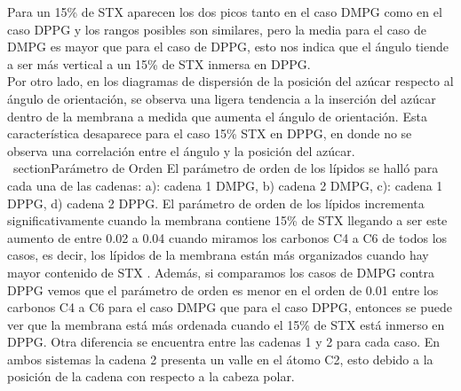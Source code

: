 
Para un 15\% de STX aparecen los dos picos tanto en el caso DMPG como en el caso DPPG y los rangos posibles son similares, pero la media para el caso de DMPG es mayor que para el caso de DPPG, esto nos indica que el \'{a}ngulo tiende a ser m\'{a}s vertical a un 15\% de STX inmersa en DPPG.\\ 

Por otro lado, en los diagramas de dispersi\'{o}n de la posici\'{o}n del az\'{u}car respecto al \'{a}ngulo de orientaci\'{o}n, se observa una ligera tendencia a la inserci\'{o}n del az\'{u}car dentro de la membrana a medida que aumenta el \'{a}ngulo de orientaci\'{o}n. Esta caracter\'{i}stica desaparece para el caso 15\% STX en DPPG, en donde no se observa una correlaci\'{o}n entre el \'{a}ngulo y la posici\'{o}n del az\'{u}car.\\
\
section{Par\'{a}metro de Orden}
El par\'{a}metro de orden de los l\'{i}pidos se hall\'{o} para cada una de las cadenas:
a): cadena 1 DMPG, b) cadena 2 DMPG, c): cadena 1 DPPG, d) cadena 2 DPPG. El par\'{a}metro de orden de los l\'{i}pidos incrementa significativamente  cuando la membrana contiene 15\% de STX llegando a ser este aumento de entre 0.02 a 0.04 cuando miramos los carbonos C4 a C6 de todos los casos, es decir, los l\'{i}pidos de la membrana est\'{a}n m\'{a}s organizados cuando hay mayor contenido de STX . Adem\'{a}s, si comparamos los casos de DMPG contra DPPG vemos que el par\'{a}metro de orden es menor en el orden de 0.01 entre los carbonos C4 a C6 para el caso DMPG que para el caso DPPG, entonces se puede ver que la membrana est\'{a} m\'{a}s ordenada cuando el 15\% de STX est\'{a} inmerso en DPPG. Otra diferencia se encuentra entre las cadenas 1 y 2 para cada caso. En ambos sistemas la cadena 2 presenta un valle en el \'{a}tomo C2, esto debido a la posici\'{o}n de la cadena con respecto a la cabeza polar.\\

